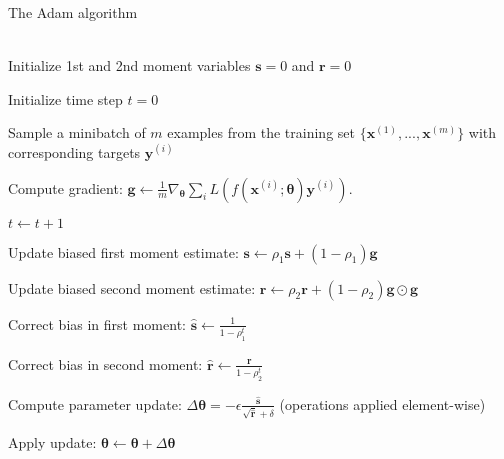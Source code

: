 \begin{algorithm}
\caption{The Adam algorithm}\label{alg:Adam}
\begin{algorithmic}
    \Require{Exponential decay rates for momentum estimates, $\rho_1$ and
    $\rho_2$ in $[0,1)$. (Suggested defaults: 0.9 and 0.999 respectively)}
    \\
    Initialize 1st and 2nd moment variables $\boldsymbol{s}=0$ and
    $\boldsymbol{r}=0$

    Initialize time step $t=0$


        Sample a minibatch of $m$ examples from the training set
        $\{\boldsymbol{x}^{(1)}, ..., \boldsymbol{x}^{(m)}\}$ with corresponding
        targets $\boldsymbol{y}^{(i)}$
        
        Compute gradient: $\boldsymbol{g} \gets
        \frac{1}{m}\nabla_{\boldsymbol\theta}
        \sum_{i}L(f(\boldsymbol{x}^{(i)};\boldsymbol{\theta})\boldsymbol{y}^{(i)})$.
        
        $t\gets t+1$

        Update biased first moment estimate: $\boldsymbol{s}\gets
        \rho_1\boldsymbol{s} + (1-\rho_1)\boldsymbol{g}$

        Update biased second moment estimate: $\boldsymbol{r}\gets
        \rho_2\boldsymbol{r} + (1-\rho_2)\boldsymbol{g}\odot\boldsymbol{g}$

        Correct bias in first moment: $\hat{\boldsymbol{s}}\gets
        \frac{1}{1-\rho_1^t}$

        Correct bias in second moment: $\hat{\boldsymbol{r}}\gets
        \frac{\boldsymbol{r}}{1-\rho_2^t}$

        Compute parameter update: $\Delta\boldsymbol\theta =
        -\epsilon\frac{\hat{\boldsymbol{s}}}{\sqrt{\hat{\boldsymbol{r}}}+\delta}$
        (operations applied element-wise)

        Apply update: $\boldsymbol\theta\gets \boldsymbol\theta +
        \Delta\boldsymbol\theta$
    \EndWhile
\end{algorithmic}
\end{algorithm}

